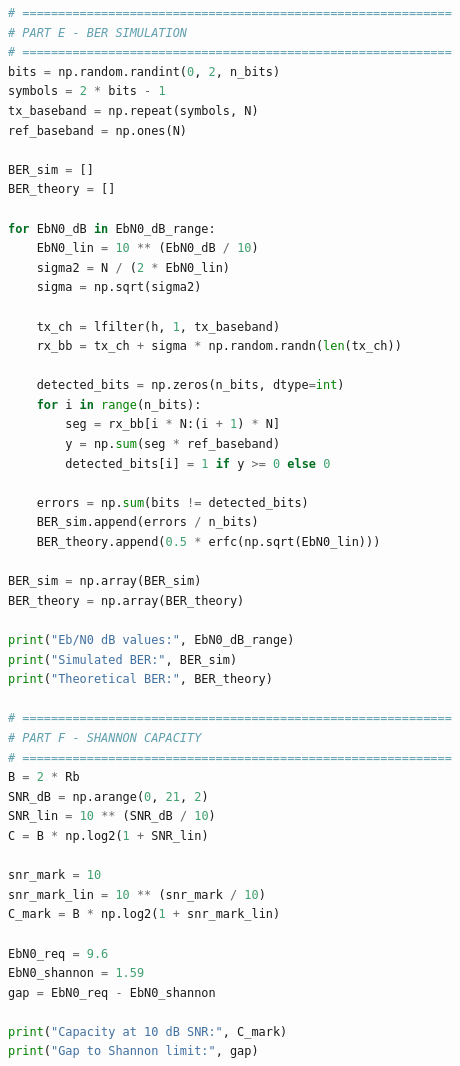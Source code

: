 \begin{lstlisting}[language=Python,
    caption={Complete Python implementation for Batch 9 BPSK system},
    basicstyle=\ttfamily\small,
    breaklines=true,
    showstringspaces=false]
# ============================================================
# PART E - BER SIMULATION
# ============================================================
bits = np.random.randint(0, 2, n_bits)
symbols = 2 * bits - 1
tx_baseband = np.repeat(symbols, N)
ref_baseband = np.ones(N)

BER_sim = []
BER_theory = []

for EbN0_dB in EbN0_dB_range:
    EbN0_lin = 10 ** (EbN0_dB / 10)
    sigma2 = N / (2 * EbN0_lin)
    sigma = np.sqrt(sigma2)

    tx_ch = lfilter(h, 1, tx_baseband)
    rx_bb = tx_ch + sigma * np.random.randn(len(tx_ch))

    detected_bits = np.zeros(n_bits, dtype=int)
    for i in range(n_bits):
        seg = rx_bb[i * N:(i + 1) * N]
        y = np.sum(seg * ref_baseband)
        detected_bits[i] = 1 if y >= 0 else 0

    errors = np.sum(bits != detected_bits)
    BER_sim.append(errors / n_bits)
    BER_theory.append(0.5 * erfc(np.sqrt(EbN0_lin)))

BER_sim = np.array(BER_sim)
BER_theory = np.array(BER_theory)

print("Eb/N0 dB values:", EbN0_dB_range)
print("Simulated BER:", BER_sim)
print("Theoretical BER:", BER_theory)

# ============================================================
# PART F - SHANNON CAPACITY
# ============================================================
B = 2 * Rb
SNR_dB = np.arange(0, 21, 2)
SNR_lin = 10 ** (SNR_dB / 10)
C = B * np.log2(1 + SNR_lin)

snr_mark = 10
snr_mark_lin = 10 ** (snr_mark / 10)
C_mark = B * np.log2(1 + snr_mark_lin)

EbN0_req = 9.6
EbN0_shannon = 1.59
gap = EbN0_req - EbN0_shannon

print("Capacity at 10 dB SNR:", C_mark)
print("Gap to Shannon limit:", gap)
\end{lstlisting}
